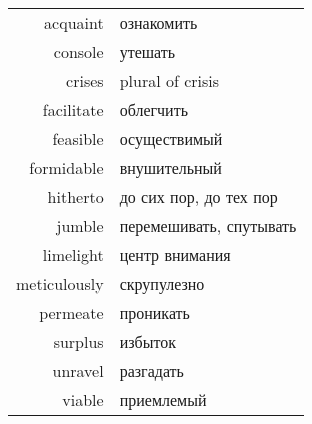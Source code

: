 \documentclass[a4paper, 12pt]{article}
\begin{document}
\begin{tabular}{rl}
	acquaint & ознакомить \\
	console & утешать \\
	crises & plural of crisis \\
	facilitate & облегчить \\
	feasible & осуществимый \\
	formidable & внушительный \\
	hitherto & до сих пор, до тех пор \\
	jumble & перемешивать, спутывать \\
	limelight & центр внимания \\
	meticulously & скрупулезно \\
	permeate & проникать \\
	surplus & избыток \\
	unravel & разгадать \\
	viable & приемлемый \\
\end{tabular}
\end{document}
